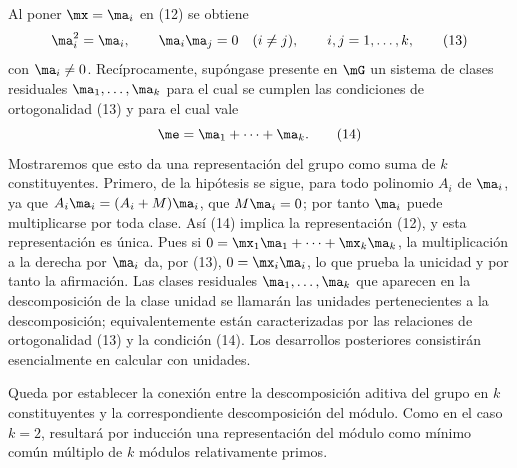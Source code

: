 \documentclass[11pt]{article}
\begin{document}
Al poner $\mx=\ma_i$ en (12) se obtiene
\begin{equation}
 \ma_i^2=\ma_i,
 \qquad \ma_i\ma_j=0\quad(i\ne j),
 \qquad i,j=1,\ldots,k,
\tag{13}
\end{equation}
con $\ma_i\ne0$. Recíprocamente, supóngase presente en $\mG$ un sistema de clases residuales $\ma_1,\ldots,\ma_k$ para el cual se cumplen las condiciones de ortogonalidad (13) y para el cual vale
\begin{equation}
 \me=\ma_1+\cdots+\ma_k.
\tag{14}
\end{equation}
Mostraremos que esto da una representación del grupo como suma de $k$ constituyentes. Primero, de la hipótesis se sigue, para todo polinomio $A_i$ de $\ma_i$, ya que $A_i\ma_i=(A_i+M)\ma_i$, que $M\ma_i=0$; por tanto $\ma_i$ puede multiplicarse por toda clase. Así (14) implica la representación (12), y esta representación es única. Pues si $0=\mx_1\ma_1+\cdots+\mx_k\ma_k$, la multiplicación a la derecha por $\ma_i$ da, por (13), $0=\mx_i\ma_i$, lo que prueba la unicidad y por tanto la afirmación. Las clases residuales $\ma_1,\ldots,\ma_k$ que aparecen en la descomposición de la clase unidad se llamarán las unidades pertenecientes a la descomposición; equivalentemente están caracterizadas por las relaciones de ortogonalidad (13) y la condición (14). Los desarrollos posteriores consistirán esencialmente en calcular con unidades.

Queda por establecer la conexión entre la descomposición aditiva del grupo en $k$ constituyentes y la correspondiente descomposición del módulo. Como en el caso $k=2$, resultará por inducción una representación del módulo como mínimo común múltiplo de $k$ módulos relativamente primos.
\end{document}
